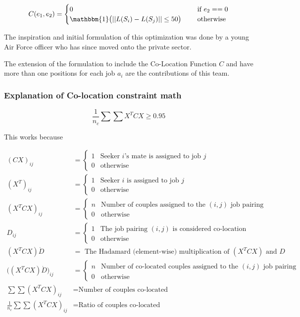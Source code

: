 \[C(e_1,e_2) = \begin{cases}
0 \quad & \text{ if } e_2 == 0 \\
 \mathbbm{1}\big( || L(S_i) - L(S_j) || \leq 50 \big) \quad & \text{ otherwise }
 \end{cases}\]


The inspiration and initial formulation of this optimization was done by a young Air Force officer who has since moved onto the private sector. 

The extension of the formulation to include the Co-Location Function $C$ and have more than one positions for each job $a_i$ are the contributions of this team. 

\subsubsection{Explanation of Co-location constraint math}

 \[\frac{1}{n_c} \sum \sum X^TCX \geq 0.95\]

 This works because

 \begin{align*}
(CX)_{ij} &= \begin{cases}
1 & \text{Seeker $i$'s mate is assigned to job $j$} \\
0& \text{otherwise}
\end{cases} \\
(X^T)_{ij} &= \begin{cases}
1 & \text{Seeker $i$ is assigned to job $j$} \\
0 & \text{otherwise}
\end{cases}\\
(X^TCX)_{ij} &= \begin{cases}
n & \text{Number of couples assigned to the $(i,j)$ job pairing} \\
0 & \text{otherwise}
\end{cases}\\
D_{ij} &= \begin{cases}
1 & \text{The job pairing $(i,j)$ is considered co-location } \\
0 & \text{otherwise}
\end{cases}\\
(X^TCX) \dot D &= \text{ The Hadamard (element-wise) multiplication of $(X^TCX)$ and $D$} \\
\big((X^TCX) \dot D \big)_{ij} &= \begin{cases}
n & \text{Number of co-located couples assigned to the $(i,j)$ job pairing} \\
0 & \text{otherwise}
\end{cases}\\
\sum \sum (X^TCX)_{ij} &= \text{Number of couples co-located} \\
\frac{1}{n_c} \sum \sum (X^TCX)_{ij} &= \text{Ratio of couples co-located}
 \end{align*}
